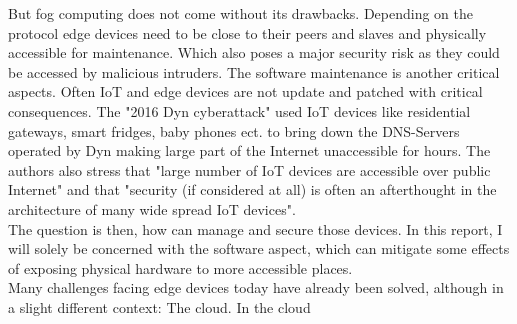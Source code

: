 But fog computing does not come without its drawbacks. Depending on the protocol edge devices need to be close to their peers and slaves and physically accessible for maintenance. Which also poses a major security risk as they could be accessed by malicious intruders. The software maintenance is another critical aspects. Often IoT and edge devices are not update and patched with critical consequences. The "2016 Dyn cyberattack" used IoT devices like residential gateways, smart fridges, baby phones ect. to bring down the DNS-Servers operated by Dyn making large part of the Internet unaccessible for hours\cite{dynAttack}. The authors also stress that "large number of IoT devices are accessible over public Internet" and that "security (if considered at all) is often an afterthought in the architecture of many wide spread IoT devices"\cite{dynAttack}.\\
The question is then, how can manage and secure those devices. In this report, I will solely be concerned with the software aspect, which can mitigate some effects of exposing physical hardware to more accessible places.\\
Many challenges facing edge devices today have already been solved, although in a slight different context: The cloud\cite{Introducing:kubeedge}. In the cloud 




